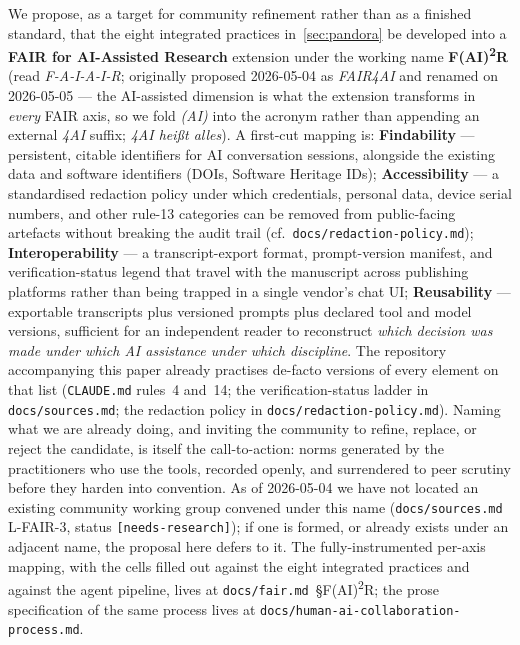 \documentclass[11pt,a4paper]{article}
\begin{document}
We propose, as a target for community refinement rather than as a
finished standard, that the eight integrated practices in~\cref{sec:pandora}
be developed into a \textbf{FAIR for AI-Assisted Research} extension
under the working name \textbf{F(AI)\textsuperscript{2}R} (read
\emph{F-A-I-A-I-R}; originally proposed 2026-05-04 as \emph{FAIR4AI}
and renamed on 2026-05-05 --- the AI-assisted dimension is what the
extension transforms in \emph{every} FAIR axis, so we fold \emph{(AI)}
into the acronym rather than appending an external \emph{4AI} suffix;
\emph{4AI hei\ss{}t alles}). A first-cut mapping is:
\textbf{Findability} --- persistent, citable identifiers for AI
conversation sessions, alongside the existing data and software
identifiers (DOIs, Software Heritage IDs); \textbf{Accessibility} --- a
standardised redaction policy under which credentials, personal data,
device serial numbers, and other rule-13 categories can be removed from
public-facing artefacts without breaking the audit trail (cf.\
\texttt{docs/redaction-policy.md}); \textbf{Interoperability} --- a
transcript-export format, prompt-version manifest, and
verification-status legend that travel with the manuscript across
publishing platforms rather than being trapped in a single vendor's chat
UI; \textbf{Reusability} --- exportable transcripts plus versioned
prompts plus declared tool and model versions, sufficient for an
independent reader to reconstruct \emph{which decision was made under
which AI assistance under which discipline}. The repository
accompanying this paper already practises de-facto versions of every
element on that list (\texttt{CLAUDE.md} rules~4 and~14; the
verification-status ladder in \texttt{docs/sources.md}; the redaction
policy in \texttt{docs/redaction-policy.md}). Naming what we are
already doing, and inviting the community to refine, replace, or reject
the candidate, is itself the call-to-action: norms generated by the
practitioners who use the tools, recorded openly, and surrendered to
peer scrutiny before they harden into convention. As of 2026-05-04 we
have not located an existing community working group convened under
this name (\texttt{docs/sources.md} L-FAIR-3, status
\texttt{[needs-research]}); if one is formed, or already exists under
an adjacent name, the proposal here defers to it. The
fully-instrumented per-axis mapping, with the cells filled out against
the eight integrated practices and against the agent pipeline, lives at
\texttt{docs/fair.md}~\S F(AI)\textsuperscript{2}R; the prose
specification of the same process lives at
\texttt{docs/human-ai-collaboration-process.md}.
\end{document}
